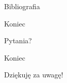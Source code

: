 \documentclass[polish]{beamer}
\begin{document}
\begin{frame}[allowframebreaks]{Bibliografia}
    
    
\end{frame}

\begin{frame}{Koniec}
    \begin{center}
        {\huge Pytania?}
    \end{center}
\end{frame}

\begin{frame}{Koniec}
    \begin{center}
        {\huge Dziękuję za uwagę!}
    \end{center}
\end{frame}

\pglastframe


\end{document}
